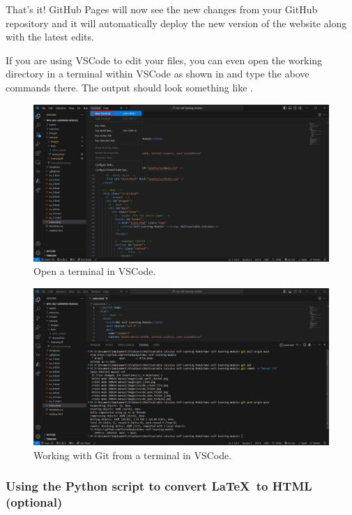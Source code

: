 \documentclass[a4paper,10pt]{article}
\begin{document}
That's it! GitHub Pages will now see the new changes from your GitHub repository and it will automatically deploy the new version of the website along with the latest edits. 

If you are using VSCode to edit your files, you can even open the working directory in a terminal within VSCode as shown in  and type the above commands there. The output should look something like .

\begin{figure}[htbp]
    \centering
    \includegraphics[width=\textwidth]{vscode_open_terminal.png}
    \caption{Open a terminal in VSCode.}
    \label{fig:vscode_open_terminal}   
\end{figure}

\begin{figure}[htbp]
    \centering
    \includegraphics[width=\textwidth]{usage.png}
    \caption{Working with Git from a terminal in VSCode.}
    \label{fig:usage}   
\end{figure}

\subsubsection{Using the Python script to convert \LaTeX\ to HTML (optional)}
\end{document}
